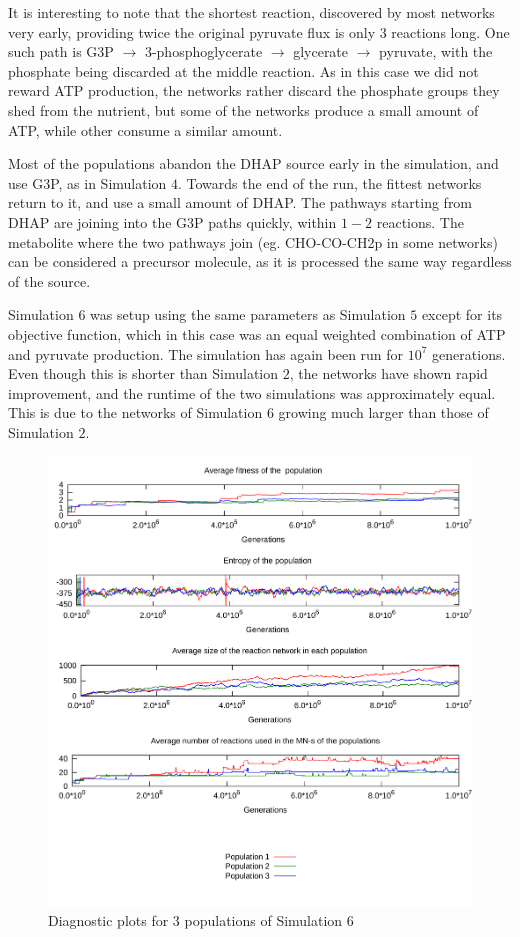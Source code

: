 \documentclass[a4paper,12pt]{article}
\begin{document}
It is interesting to note that the shortest reaction, discovered by most networks very early, providing twice the original pyruvate flux is only $3$ reactions long. One such path is G3P $\rightarrow$ 3-phosphoglycerate $\rightarrow$ glycerate $\rightarrow$ pyruvate, with the phosphate being discarded at the middle reaction. 
As in this case we did not reward ATP production, the networks rather discard the phosphate groups they shed from the nutrient, but some of the networks produce a small amount of ATP, while other consume a similar amount. 

Most of the populations abandon the DHAP source early in the simulation, and use G3P, as in Simulation $4$. Towards the end of the run, the fittest networks return to it, and use a small amount of DHAP. The pathways starting from DHAP are joining into the G3P paths quickly, within $1-2$ reactions. The metabolite where the two pathways join (eg. CHO-CO-CH2p in some networks) can be considered a precursor molecule, as it is processed the same way regardless of the source. 




Simulation $6$ was setup using the same parameters as Simulation $5$ except for its objective function, which in this case was an equal weighted combination of ATP and pyruvate production. The simulation has again been run for $10^7$ generations. Even though this is shorter than Simulation $2$, the networks have shown rapid improvement, and the runtime of the two simulations was approximately equal. This is due to the networks of Simulation $6$ growing much larger than those of Simulation $2$. 

\begin{figure}[htpb]
	\centering
	\includegraphics[width=0.8\linewidth]{simulationequalatppyruvate.pdf}
	\caption{Diagnostic plots for 3 populations of Simulation 6}
	\label{fig:simulationequalatppyruvate}
\end{figure}
\end{document}
